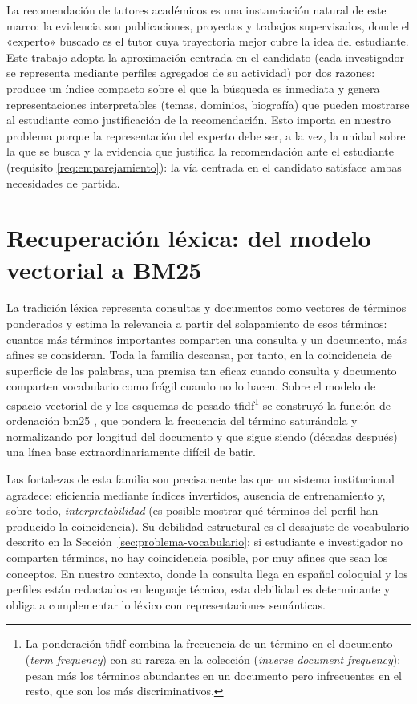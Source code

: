 La recomendación de tutores académicos es una instanciación natural de este marco: la evidencia son publicaciones, proyectos y trabajos supervisados, donde el «experto» buscado es el tutor cuya trayectoria mejor cubre la idea del estudiante.
Este trabajo adopta la aproximación centrada en el candidato (cada investigador se representa mediante perfiles agregados de su actividad) por dos razones: produce un índice compacto sobre el que la búsqueda es inmediata y genera representaciones interpretables (temas, dominios, biografía) que pueden mostrarse al estudiante como justificación de la recomendación.
Esto importa en nuestro problema porque la representación del experto debe ser, a la vez, la unidad sobre la que se busca y la evidencia que justifica la recomendación ante el estudiante (requisito \ref{req:emparejamiento}): la vía centrada en el candidato satisface ambas necesidades de partida.

\section{Recuperación léxica: del modelo vectorial a BM25}
\label{sec:sota-lexica}

La tradición léxica representa consultas y documentos como vectores de términos ponderados y estima la relevancia a partir del solapamiento de esos términos: cuantos más términos importantes comparten una consulta y un documento, más afines se consideran.
Toda la familia descansa, por tanto, en la coincidencia de superficie de las palabras, una premisa tan eficaz cuando consulta y documento comparten vocabulario como frágil cuando no lo hacen.
Sobre el modelo de espacio vectorial de \citet{salton1975vector} y los esquemas de pesado \gls{tfidf}\footnote{La ponderación \gls{tfidf} combina la frecuencia de un término en el documento (\emph{term frequency}) con su rareza en la colección (\emph{inverse document frequency}): pesan más los términos abundantes en un documento pero infrecuentes en el resto, que son los más discriminativos.} se construyó la función de ordenación \gls{bm25} \citep{robertson2009bm25}, que pondera la frecuencia del término saturándola y normalizando por longitud del documento y que sigue siendo (décadas después) una línea base extraordinariamente difícil de batir.

Las fortalezas de esta familia son precisamente las que un sistema institucional agradece: eficiencia mediante índices invertidos, ausencia de entrenamiento y, sobre todo, \emph{interpretabilidad} (es posible mostrar qué términos del perfil han producido la coincidencia).
Su debilidad estructural es el desajuste de vocabulario descrito en la Sección~\ref{sec:problema-vocabulario}: si estudiante e investigador no comparten términos, no hay coincidencia posible, por muy afines que sean los conceptos.
En nuestro contexto, donde la consulta llega en español coloquial y los perfiles están redactados en lenguaje técnico, esta debilidad es determinante y obliga a complementar lo léxico con representaciones semánticas.

